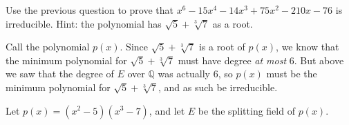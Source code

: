 \documentclass[11pt]{exam}
\def\Q{\mathbb Q}
\begin{document}
\begin{questions}

\question[4] Use the previous question to prove that $x^6-15 x^4-14 x^3+75 x^2-210 x-76$ is irreducible. Hint: the polynomial has $\sqrt{5}+\sqrt[3]{7}$ as a root.
\begin{solution}
Call the polynomial $p(x)$.  Since $\sqrt{5} + \sqrt[3]{7}$ is a root of $p(x)$, we know that the minimum polynomial for $\sqrt{5} + \sqrt[3]{7}$ must have degree {\em at most} 6.  But above we saw that the degree of $E$ over $\Q$ was actually 6, so $p(x)$ must be the minimum polynomial for $\sqrt{5}+\sqrt[3]{7}$, and as such be irreducible.
\end{solution}
\vfill
\vfill

\newpage
\question Let $p(x) = (x^2 - 5)(x^3 - 7)$, and let $E$ be the splitting field of $p(x)$. 
\end{questions}
\end{document}
